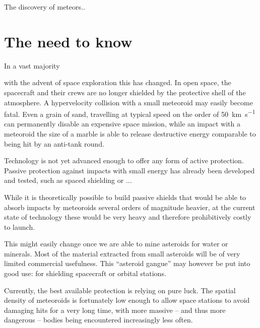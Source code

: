 
The discovery of meteors..


\section{The need to know}
    In a vast majority

    with the advent of space exploration this has changed. In open space, the spacecraft and their crews are no longer shielded
    by the protective shell of the atmosphere. A hypervelocity collision with a small meteoroid may easily become fatal.
    Even a grain of sand, travelling at typical speed on the order of \SI{50}{\kilo\metre\per\second} can permanently disable
    an expensive space mission, while an impact with a meteoroid the size of a marble is able to release
    destructive energy comparable to being hit by an anti-tank round.

    Technology is not yet advanced enough to offer any form of active protection.
    Passive protection against impacts with small energy has already been developed and tested,
    such as spaced shielding \cite{...} or ...

    While it is theoretically possible to build passive shields that would be able to absorb impacts
    by meteoroids several orders of magnitude heavier, at the current state of technology these would
    be very heavy and therefore prohibitively costly to launch.

    This might easily change once we are able to mine asteroids for water or minerals.
    Most of the material extracted from small asteroids will be of very limited commercial usefulness.
    This ``asteroid gangue'' may however be put into good use: for shielding spacecraft or orbital stations.

    Currently, the best available protection is relying on pure luck. The spatial density of meteoroids is
    fortunately low enough to allow space stations to avoid damaging hits for a very long time,
    with more massive -- and thus more dangerous -- bodies being encountered increasingly less often.

